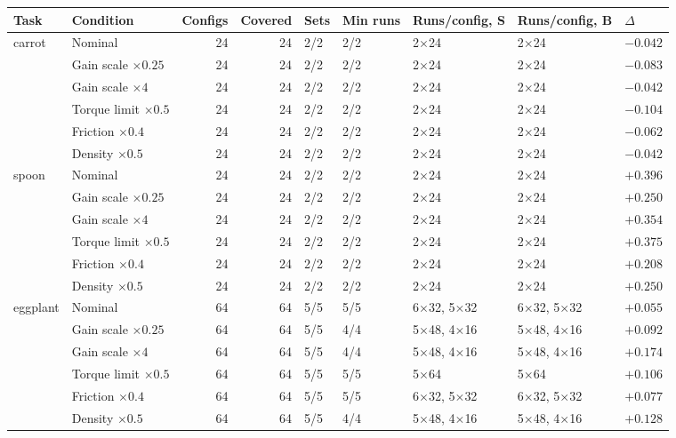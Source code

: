 \begin{tabular}{@{}llrrlllll@{}}
\toprule
Task & Condition & Configs & Covered & Sets & Min runs & Runs/config, S & Runs/config, B & $\Delta$ \\
\midrule
carrot & Nominal & 24 & 24 & 2/2 & 2/2 & 2$\times$24 & 2$\times$24 & $-0.042$ \\
 & Gain scale $\times0.25$ & 24 & 24 & 2/2 & 2/2 & 2$\times$24 & 2$\times$24 & $-0.083$ \\
 & Gain scale $\times4$ & 24 & 24 & 2/2 & 2/2 & 2$\times$24 & 2$\times$24 & $-0.042$ \\
 & Torque limit $\times0.5$ & 24 & 24 & 2/2 & 2/2 & 2$\times$24 & 2$\times$24 & $-0.104$ \\
 & Friction $\times0.4$ & 24 & 24 & 2/2 & 2/2 & 2$\times$24 & 2$\times$24 & $-0.062$ \\
 & Density $\times0.5$ & 24 & 24 & 2/2 & 2/2 & 2$\times$24 & 2$\times$24 & $-0.042$ \\
\midrule
spoon & Nominal & 24 & 24 & 2/2 & 2/2 & 2$\times$24 & 2$\times$24 & $+0.396$ \\
 & Gain scale $\times0.25$ & 24 & 24 & 2/2 & 2/2 & 2$\times$24 & 2$\times$24 & $+0.250$ \\
 & Gain scale $\times4$ & 24 & 24 & 2/2 & 2/2 & 2$\times$24 & 2$\times$24 & $+0.354$ \\
 & Torque limit $\times0.5$ & 24 & 24 & 2/2 & 2/2 & 2$\times$24 & 2$\times$24 & $+0.375$ \\
 & Friction $\times0.4$ & 24 & 24 & 2/2 & 2/2 & 2$\times$24 & 2$\times$24 & $+0.208$ \\
 & Density $\times0.5$ & 24 & 24 & 2/2 & 2/2 & 2$\times$24 & 2$\times$24 & $+0.250$ \\
\midrule
eggplant & Nominal & 64 & 64 & 5/5 & 5/5 & 6$\times$32, 5$\times$32 & 6$\times$32, 5$\times$32 & $+0.055$ \\
 & Gain scale $\times0.25$ & 64 & 64 & 5/5 & 4/4 & 5$\times$48, 4$\times$16 & 5$\times$48, 4$\times$16 & $+0.092$ \\
 & Gain scale $\times4$ & 64 & 64 & 5/5 & 4/4 & 5$\times$48, 4$\times$16 & 5$\times$48, 4$\times$16 & $+0.174$ \\
 & Torque limit $\times0.5$ & 64 & 64 & 5/5 & 5/5 & 5$\times$64 & 5$\times$64 & $+0.106$ \\
 & Friction $\times0.4$ & 64 & 64 & 5/5 & 5/5 & 6$\times$32, 5$\times$32 & 6$\times$32, 5$\times$32 & $+0.077$ \\
 & Density $\times0.5$ & 64 & 64 & 5/5 & 4/4 & 5$\times$48, 4$\times$16 & 5$\times$48, 4$\times$16 & $+0.128$ \\
\bottomrule
\end{tabular}
